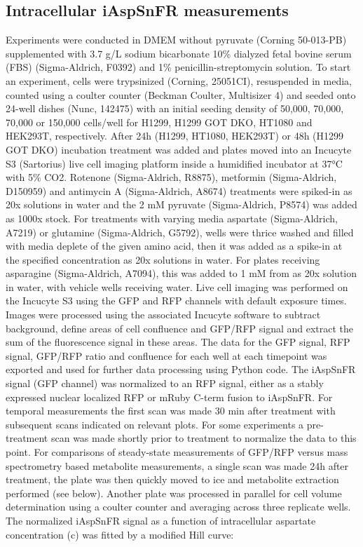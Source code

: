 \documentclass[9pt,lineno]{elife}
\begin{document}
\subsection{Intracellular iAspSnFR measurements}
Experiments were conducted in DMEM without pyruvate (Corning 50-013-PB) supplemented with 3.7 g/L sodium bicarbonate 10\% dialyzed fetal bovine serum (FBS) (Sigma-Aldrich, F0392) and 1\% penicillin-streptomycin solution.
To start an experiment, cells were trypsinized (Corning, 25051CI), resuspended in media, counted using a coulter counter (Beckman Coulter, Multisizer 4) and seeded onto 24-well dishes (Nunc, 142475) with an initial seeding density of 50,000, 70,000, 70,000 or 150,000 cells/well for H1299, H1299 GOT DKO, HT1080 and HEK293T, respectively. After 24h (H1299, HT1080, HEK293T) or 48h (H1299 GOT DKO) incubation treatment was added and plates moved into an Incucyte S3 (Sartorius) live cell imaging platform inside a humidified incubator at 37°C with 5\% CO2. Rotenone (Sigma-Aldrich, R8875), metformin (Sigma-Aldrich, D150959) and antimycin A (Sigma-Aldrich, A8674) treatments were spiked-in as 20x solutions in water and the 2 mM pyruvate (Sigma-Aldrich, P8574) was added as 1000x stock.
For treatments with varying media aspartate (Sigma-Aldrich, A7219) or glutamine (Sigma-Aldrich, G5792), wells were thrice washed and filled with media deplete of the given amino acid, then it was added as a spike-in at the specified concentration as 20x solutions in water.
For plates receiving asparagine (Sigma-Aldrich, A7094), this was added to 1 mM from as 20x solution in water, with vehicle wells receiving water.
Live cell imaging was performed on the Incucyte S3 using the GFP and RFP channels with default exposure times.
Images were processed using the associated Incucyte software to subtract background, define areas of cell confluence and GFP/RFP signal and extract the sum of the fluorescence signal in these areas.
The data for the GFP signal, RFP signal, GFP/RFP ratio and confluence for each well at each timepoint was exported and used for further data processing using Python code.
The iAspSnFR signal (GFP channel) was normalized to an RFP signal, either as a stably expressed nuclear localized RFP or mRuby C-term fusion to iAspSnFR.
For temporal measurements the first scan was made 30 min after treatment with subsequent scans indicated on relevant plots.
For some experiments a pre-treatment scan was made shortly prior to treatment to normalize the data to this point.
For comparisons of steady-state measurements of GFP/RFP versus mass spectrometry based metabolite measurements, a single scan was made 24h after treatment, the plate was then quickly moved to ice and metabolite extraction performed (see below).
Another plate was processed in parallel for cell volume determination using a coulter counter and averaging across three replicate wells.
The normalized iAspSnFR signal as a function of intracellular aspartate concentration (c) was fitted by a modified Hill curve:
\end{document}
